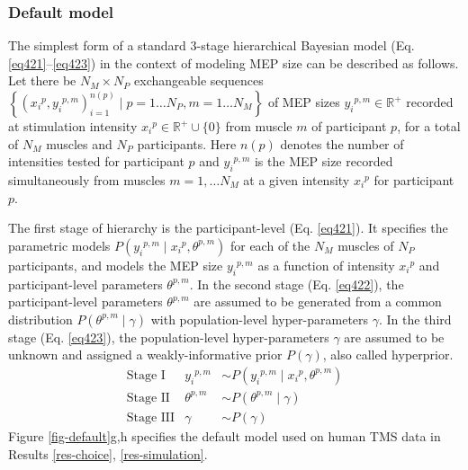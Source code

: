 \documentclass[pdflatex,sn-mathphys-ay]{sn-jnl}%
\numberwithin{equation}{subsection}
\theoremstyle{thmstyleone}%
\theoremstyle{thmstyletwo}%
\theoremstyle{thmstylethree}%
\begin{document}
\subsubsection{Default model}\label{meth-default}
The simplest form of a standard 3-stage hierarchical Bayesian model (Eq. \ref{eq421}--\ref{eq423}) in the context of modeling MEP size can be described as follows. Let there be $N_M \times N_P$ exchangeable sequences $\left\{\left({x_i}^{p}, {y_i}^{p,m}\right)_{i=1}^{n(p)} \mid p = 1\ldots N_P, m = 1\ldots N_M\right\}$ of MEP sizes ${y_i}^{p,m} \in \mathbb{R}^+$ recorded at stimulation intensity ${x_i}^p \in \mathbb{R}^+\cup\{0\}$ from muscle $m$ of participant $p$, for  a total of $N_M$ muscles and $N_P$ participants. Here $n(p)$ denotes the number of intensities tested for participant $p$ and ${y_i}^{p,m}$ is the MEP size recorded simultaneously from muscles $m=1,\ldots N_M$ at a given intensity ${x_i}^p$ for participant $p$.

The first stage of hierarchy is the participant-level (Eq. \ref{eq421}). It specifies the parametric models $P\left({y_i}^{p,m} \mid {x_i}^p, \theta^{p,m}\right)$ for each of the $N_M$ muscles of $N_P$ participants, and models the MEP size ${y_i}^{p,m}$ as a function of intensity ${x_i}^p$ and participant-level parameters $\theta^{p,m}$. In the second stage (Eq. \ref{eq422}), the participant-level parameters $\theta^{p,m}$ are assumed to be generated from a common distribution $P\left(\theta^{p,m} \mid \gamma\right)$ with population-level hyper-parameters $\gamma$. In the third stage (Eq. \ref{eq423}), the population-level hyper-parameters $\gamma$ are assumed to be unknown and assigned a weakly-informative prior $P\left(\gamma\right)$, also called hyperprior.
\begin{align}
    &\text{Stage I} &{y_i}^{p,m} &\sim P\left({y_i}^{p,m} \mid {x_i}^p, \theta^{p,m}\right)& \label{eq421}\\
    &\text{Stage II} &\theta^{p,m} &\sim P\left(\theta^{p,m} \mid \gamma\right)& \label{eq422}\\
    &\text{Stage III} &\gamma &\sim P\left(\gamma\right)& \label{eq423}
\end{align}
Figure \ref{fig-default}g,h specifies the default model used on human TMS data in Results \ref{res-choice}, \ref{res-simulation}.
\end{document}
